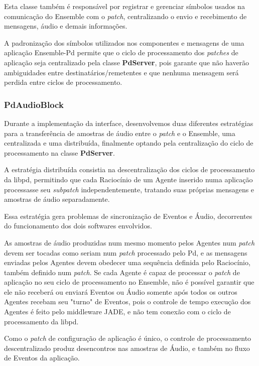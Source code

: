 \documentclass[a4paper, 11pt, twoside]{article}
\begin{document}
\begin{multicols}{2}
Esta classe também é responsável por registrar e gerenciar símbolos
usados na comunicação do Ensemble com o \textit{patch}, centralizando
o envio e recebimento de mensagens, áudio e demais informações.

A padronização dos símbolos utilizados nos componentes e mensagens
de uma aplicação Ensemble-Pd permite que o ciclo de processamento
dos \textit{patches} de aplicação seja centralizado pela classe
\textbf{PdServer}, pois garante que não haverão ambiguidades entre
destinatários/remetentes e que nenhuma mensagem será perdida
entre ciclos de processamento.

\subsubsection{PdAudioBlock}

Durante a implementação da interface, desenvolvemos duas diferentes estratégias
para a transferência de amostras de áudio entre o \textit{patch} e o Ensemble, 
uma centralizada e uma distribuída, finalmente optando pela centralização 
do ciclo de processamento na classe \textbf{PdServer}.

A estratégia distribuída consistia na descentralização dos ciclos de
processamento da libpd, permitindo que cada Raciocínio de um Agente
inserido numa aplicação processasse seu \textit{subpatch} independentemente,
tratando suas próprias mensagens e amostras de áudio separadamente.

Essa estratégia gera problemas de sincronização de Eventos e Áudio,
decorrentes do funcionamento dos dois softwares envolvidos.

As amostras de áudio produzidas num mesmo momento pelos Agentes 
num \textit{patch} devem ser tocadas como seriam num \textit{patch}
processado pelo Pd, e as mensagens enviadas pelos Agentes devem obedecer
uma sequência definida pelo Raciocínio, também definido num \textit{patch}.
Se cada Agente é capaz de processar o \textit{patch} de aplicação
no seu ciclo de processamento no Ensemble, não é possível garantir que ele
não receberá ou enviará Eventos ou Áudio somente após todos os outros Agentes 
recebam seu "turno" de Eventos, pois o controle de tempo execução dos Agentes 
é feito pelo middleware JADE, e não tem conexão com o ciclo de processamento
da libpd.

Como o \textit{patch} de configuração de aplicação é único, o controle de
processamento descentralizado produz desencontros nas amostras de Áudio, 
e também no fluxo de Eventos da aplicação.


\end{multicols}
\end{document}
